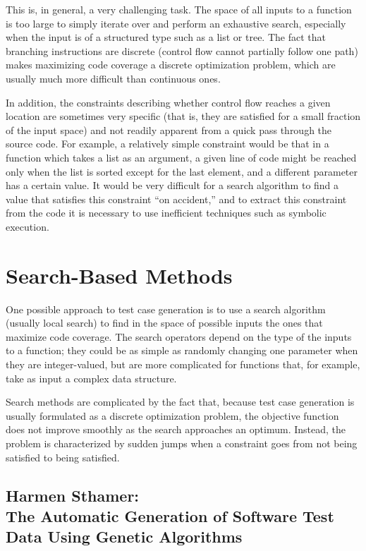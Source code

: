\documentclass{sig-alternate-05-2015}
\begin{document}
This is, in general, a very challenging task. The space of all inputs to a
function is too large to simply iterate over and perform an exhaustive search,
especially when the input is of a structured type such as a list or tree. The
fact that branching instructions are discrete (control flow cannot partially
follow one path) makes maximizing code coverage a discrete optimization
problem, which are usually much more difficult than continuous ones.

In addition, the constraints describing whether control flow reaches a given
location are sometimes very specific (that is, they are satisfied for a small
fraction of the input space) and not readily apparent from a quick pass through
the source code. For example, a relatively simple constraint would be that in a
function which takes a list as an argument, a given line of code might be
reached only when the list is sorted except for the last element, and a
different parameter has a certain value. It would be very difficult for a
search algorithm to find a value that satisfies this constraint ``on
accident,'' and to extract this constraint from the code it is necessary to use
inefficient techniques such as symbolic execution.

\section{Search-Based Methods}

One possible approach to test case generation is to use a search algorithm
(usually local search) to find in the space of possible inputs the ones that
maximize code coverage. The search operators depend on the type of the inputs
to a function; they could be as simple as randomly changing one parameter when
they are integer-valued, but are more complicated for functions that, for
example, take as input a complex data structure.

Search methods are complicated by the fact that, because test case generation
is usually formulated as a discrete optimization problem, the objective
function does not improve smoothly as the search approaches an optimum.
Instead, the problem is characterized by sudden jumps when a constraint goes
from not being satisfied to being satisfied.

\subsection{Harmen Sthamer: \\The Automatic Generation of Software Test Data
            Using Genetic Algorithms}
\end{document}
